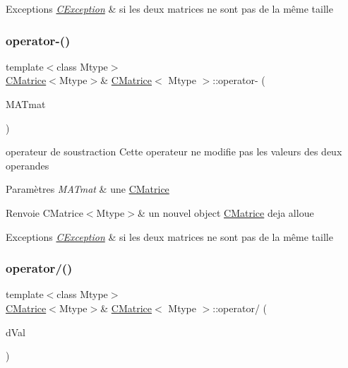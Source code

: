 \begin{DoxyExceptions}{Exceptions}
{\em \hyperlink{classCException}{C\+Exception}} & si les deux matrices ne sont pas de la même taille \\
\hline
\end{DoxyExceptions}
\mbox{\label{classCMatrice_ad5af8be8cab62aa02e3431774f1e69b2}} 
\subsubsection{\texorpdfstring{operator-\/()}{operator-()}}
{\footnotesize\ttfamily template$<$class Mtype$>$ \\
\hyperlink{classCMatrice}{C\+Matrice}$<$Mtype$>$\& \hyperlink{classCMatrice}{C\+Matrice}$<$ Mtype $>$\+::operator-\/ (\begin{DoxyParamCaption}\item[{\hyperlink{classCMatrice}{C\+Matrice}$<$ Mtype $>$ \&}]{M\+A\+Tmat }\end{DoxyParamCaption})\hspace{0.3cm}{\ttfamily [inline]}}



operateur de soustraction Cette operateur ne modifie pas les valeurs des deux operandes 


\begin{DoxyParams}{Paramètres}
{\em M\+A\+Tmat} & une \hyperlink{classCMatrice}{C\+Matrice} \\
\hline
\end{DoxyParams}
\begin{DoxyReturn}{Renvoie}
C\+Matrice$<$\+Mtype$>$\& un nouvel object \hyperlink{classCMatrice}{C\+Matrice} deja alloue 
\end{DoxyReturn}

\begin{DoxyExceptions}{Exceptions}
{\em \hyperlink{classCException}{C\+Exception}} & si les deux matrices ne sont pas de la même taille \\
\hline
\end{DoxyExceptions}
\mbox{\label{classCMatrice_a91b40219fdec6d4088874297fa4f4fa3}} 
\subsubsection{\texorpdfstring{operator/()}{operator/()}}
{\footnotesize\ttfamily template$<$class Mtype$>$ \\
\hyperlink{classCMatrice}{C\+Matrice}$<$Mtype$>$\& \hyperlink{classCMatrice}{C\+Matrice}$<$ Mtype $>$\+::operator/ (\begin{DoxyParamCaption}\item[{double}]{d\+Val }\end{DoxyParamCaption})\hspace{0.3cm}{\ttfamily [inline]}}

